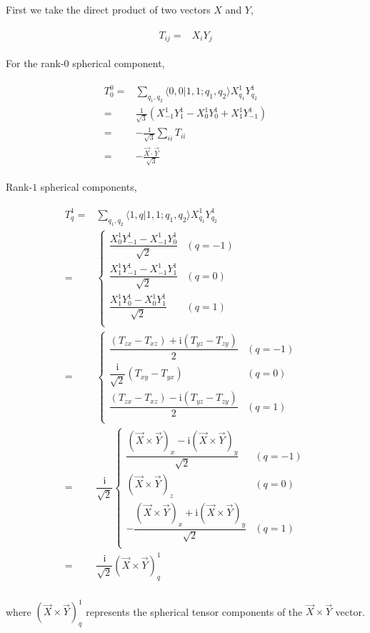\documentclass[10pt,fleqn]{article}
\newcommand{\ui}{\mathrm{i}}
\newcommand{\eqar}[1]
{
  \begin{align}
    #1
  \end{align}
}
\newcommand{\paren}[1]{{\left({#1}\right)}}
\begin{document}
First we take the direct product of two vectors $X$ and $Y$,
\eqar{
  \begin{split}
    T_{ij}=&X_iY_j
  \end{split}
}

For the rank-$0$ spherical component,
\eqar{
  \begin{split}
    T^0_0=&\sum_{q_1,q_2}\langle 0,0|1,1;q_1,q_2\rangle X^1_{q_1}Y^1_{q_2}\\
    =&\frac{1}{\sqrt3}\paren{X^1_{-1}Y^1_{1}-X^1_{0}Y^1_{0}+X^1_{1}Y^1_{-1}}\\
    =&-\frac{1}{\sqrt3}\sum_{ii}T_{ii}\\
    =&-\frac{\vec X\cdot\vec Y}{\sqrt3}
  \end{split}
}
Rank-$1$ spherical components,
\eqar{
  \begin{split}
    T^1_q=&\sum_{q_1,q_2}\langle 1,q|1,1;q_1,q_2\rangle X^1_{q_1}Y^1_{q_2}\\
    =&\begin{cases}
      \dfrac{X^1_{0}Y^1_{-1}-X^1_{-1}Y^1_{0}}{\sqrt2}&(q=-1)\\
      \dfrac{X^1_{1}Y^1_{-1}-X^1_{-1}Y^1_{1}}{\sqrt2}&(q=0)\\
      \dfrac{X^1_{1}Y^1_{0}-X^1_{0}Y^1_{1}}{\sqrt2}&(q=1)\\
    \end{cases}\\
    =&\begin{cases}
      \dfrac{\paren{T_{zx}-T_{xz}}+\ui\paren{T_{yz}-T_{zy}}}{2}&(q=-1)\\
      \dfrac{\ui}{\sqrt2}\paren{T_{xy}-T_{yx}}&(q=0)\\
      \dfrac{\paren{T_{zx}-T_{xz}}-\ui\paren{T_{yz}-T_{zy}}}{2}&(q=1)\\
    \end{cases}\\
    =&\dfrac{\ui}{\sqrt2}\begin{cases}
      \dfrac{\paren{\vec X\times\vec Y}_x-\ui\paren{\vec X\times\vec Y}_y}{\sqrt2}&(q=-1)\\
      \paren{\vec X\times\vec Y}_z&(q=0)\\
      -\dfrac{\paren{\vec X\times\vec Y}_x+\ui\paren{\vec X\times\vec Y}_y}{\sqrt2}&(q=1)\\
    \end{cases}\\
    =&\dfrac{\ui}{\sqrt2}\paren{\vec X\times\vec Y}^1_q\\
  \end{split}
}
where $\paren{\vec X\times\vec Y}^1_q$ represents the spherical tensor components
of the $\vec X\times\vec Y$ vector.\\
\end{document}
